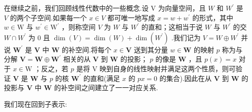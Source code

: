 在继续之前，我们回顾线性代数中的一些概念.设 V 为向量空间，且 \(W\) 和 \({W}^{\prime }\) 是 \(V\) 的两个子空间.如果每一个 \(x \in  V\) 都可唯一地写成 \(x = w + {w}^{\prime }\) 的形式，其中 \(w \in  \mathrm{W}\) 与 \({w}^{\prime } \in  {\mathrm{W}}^{\prime }\) ，则称空间 \(V\) 为 \(W\) 与 \({W}^{\prime }\) 的直和；这相当于说 \(W\) 与 \({W}^{\prime }\) 的交 \(W \cap  {W}^{\prime }\) 为 0 且 \(\dim \left( V\right)  = \dim \left( W\right)  + \dim \left( {W}^{\prime }\right)\) .我们记为 \(V = W \oplus  {W}^{\prime }\) 并说 \({\mathbf{W}}^{\prime }\) 是 \(\mathbf{V}\) 中 \(\mathbf{W}\) 的补空间.将每个 \(x \in  \mathbf{V}\) 送到其分量 \(w \in  \mathbf{W}\) 的映射 \(p\) 称为与分解 \(\mathbf{V} = \mathbf{W} \oplus  {\mathbf{W}}^{\prime }\) 相关的从 \(\mathbf{V}\) 到 \(\mathbf{W}\) 的投影； \(p\) 的像是 \(\mathbf{W}\) ，且 \(p\left( x\right)  = x\) 对于 \(x \in  \mathrm{W}\) ；反之，若 \(p\) 是将 \(\mathrm{V}\) 映到自身的线性映射并满足这两个性质，则可验证 \(\mathbf{V}\) 是 \(\mathbf{W}\) 与 \(p\) 的核 \({\mathbf{W}}^{\prime }\) 的直和(满足 \(x\) 的 \({px} = 0\) 的集合).因此在从 \(\mathbf{V}\) 到 \(\mathbf{W}\) 的投影与 \(\mathbf{V}\) 中 \(\mathbf{W}\) 的补空间之间建立了一一对应关系.

我们现在回到子表示:


